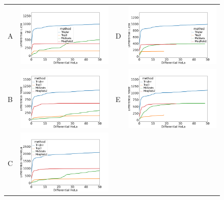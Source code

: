 \documentclass[11pt]{article}
\begin{document}
\begin{figure}[hbt]
    \centering
    \begin{tabular}{lclc} 
        A & \includegraphics[width=0.4\linewidth]{../../result/plot_full_complete_full_lib_run_20221215/diff_HeLa_vs_nonHeLa_ID_ecoli_0.png} & 
        D & \includegraphics[width=0.4\linewidth]{../../result/plot_full_complete_full_lib_run_20221215/diff_HeLa_vs_nonHeLa_ID_ecoli_0.51.png} \\ 
        B & \includegraphics[width=0.4\linewidth]{../../result/plot_full_complete_full_lib_run_20221215/diff_HeLa_vs_nonHeLa_ID_yeast_0.png} & 
        E & \includegraphics[width=0.4\linewidth]{../../result/plot_full_complete_full_lib_run_20221215/diff_HeLa_vs_nonHeLa_ID_yeast_0.51.png} \\
        C & \includegraphics[width=0.4\linewidth]{../../result/plot_full_complete_full_lib_run_20221215/diff_HeLa_vs_nonHeLa_ID_all_0.png} & 

\end{tabular}
\end{figure}
\end{document}
